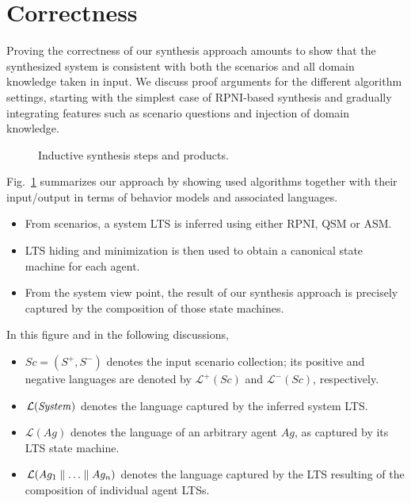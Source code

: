 \section{Correctness\label{section:inductive-correctness}}

Proving the correctness of our synthesis approach amounts to show that the synthesized system is consistent with both the scenarios and all domain knowledge taken in input. We discuss proof arguments for the different algorithm settings, starting with the simplest case of RPNI-based synthesis and gradually integrating features such as scenario questions and injection of domain knowledge.

\begin{figure}\centering
{}
\caption{Inductive synthesis steps and products.\label{figure:synthesis-flow-model}} 
\end{figure}

Fig.~\ref{figure:synthesis-flow-model} summarizes our approach by showing used algorithms together with their input/output in terms of behavior models and associated languages. 
\begin{itemize}
\item From scenarios, a system LTS is inferred using either RPNI, QSM or ASM. 
\item LTS hiding and minimization is then used to obtain a canonical state machine for each agent. 
\item From the system view point, the result of our synthesis approach is precisely captured by the composition of those state machines.
\end{itemize}

In this figure and in the following discussions,
\begin{itemize}
\item $Sc = (S^+,S^-)$ denotes the input scenario collection; its positive and negative languages are denoted by $\mathcal{L}^+(Sc)$ and $\mathcal{L}^-(Sc)$, respectively.
\item $\mathcal{L}(\mbox{\emph{System}})$ denotes the language captured by the inferred system LTS.
\item $\mathcal{L}(Ag)$ denotes the language of an arbitrary agent $Ag$, as captured by its LTS state machine.
\item $\mathcal{L}(Ag_1 \parallel \ldots \parallel Ag_n)$ denotes the language captured by the LTS resulting of the composition of individual agent LTSs.
\end{itemize}


